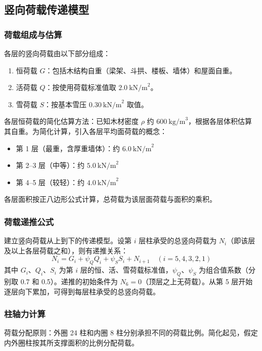 \documentclass[12pt,a4paper,UTF8]{ctexart}
\begin{document}
\subsection{竖向荷载传递模型}

\subsubsection{荷载组成与估算}

各层的竖向荷载由以下部分组成：
\begin{enumerate}
    \item 恒荷载 $G$：包括木结构自重（梁架、斗拱、楼板、墙体）和屋面自重。
    \item 活荷载 $Q$：按使用荷载标准值取 $2.0\ \text{kN/m}^2$\cite{gb50009}。
    \item 雪荷载 $S$：按基本雪压 $0.30\ \text{kN/m}^2$ 取值\cite{gb50009}。
\end{enumerate}

各层恒荷载的简化估算方法\cite{li1998}：已知木材密度 $\rho$ 约 $600\ \text{kg/m}^3$，根据各层体积估算其自重。为简化计算，引入各层平均面荷载的概念：
\begin{itemize}
    \item 第 1 层（最重，含厚重墙体）：约 $6.0\ \text{kN/m}^2$
    \item 第 2--3 层（中等）：约 $5.0\ \text{kN/m}^2$
    \item 第 4--5 层（较轻）：约 $4.0\ \text{kN/m}^2$
\end{itemize}
各层面积按正八边形公式计算，总荷载为该层面荷载与面积的乘积。

\subsubsection{荷载递推公式}

建立竖向荷载从上到下的传递模型。设第 $i$ 层柱承受的总竖向荷载为 $N_i$（即该层及以上各层荷载之和），则有递推关系：
\[
    N_i = G_i + \psi_Q Q_i + \psi_S S_i + N_{i+1} \quad (i = 5, 4, 3, 2, 1)
\]
其中 $G_i$、$Q_i$、$S_i$ 为第 $i$ 层的恒、活、雪荷载标准值，$\psi_Q$、$\psi_S$ 为组合值系数（分别取 0.7 和 0.5）。递推的初始条件为 $N_6 = 0$（顶层之上无荷载）。从第 5 层开始逐层向下累加，可得到每层柱承受的总竖向荷载。

\subsubsection{柱轴力计算}

荷载分配原则：外圈 24 柱和内圈 8 柱分别承担不同的荷载比例。简化起见，假定内外圈柱按其所支撑面积的比例分配荷载。
\end{document}
